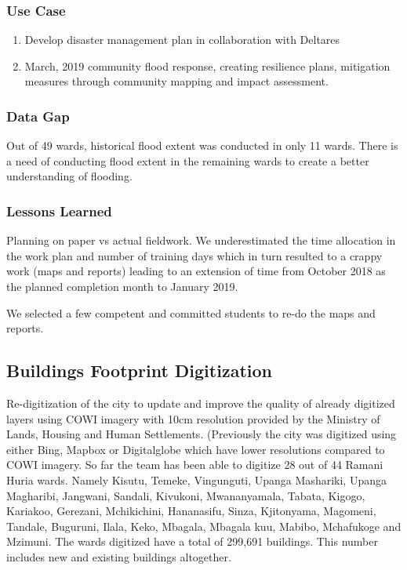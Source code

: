 \documentclass[a4paper,12pt,twoside]{article}
\begin{document}
\subsubsection{Use Case}
\begin{enumerate}
    \item Develop disaster management plan in collaboration with Deltares
    \item March, 2019 community flood response, creating resilience plans, mitigation measures through community mapping and impact assessment.
\end{enumerate}


\subsubsection{Data Gap}
Out of 49 wards, historical flood extent was conducted in only 11 wards. There is a need of conducting flood extent in the remaining wards to create a better understanding of flooding.

\subsubsection{Lessons Learned}
Planning on paper vs actual fieldwork. We underestimated the time allocation in the work plan and number of training days which in turn resulted to a crappy work (maps and reports) leading to an  extension of time from October 2018 as the planned completion month to January 2019.

\medskip
We selected a few competent and committed students to re-do the maps and reports.


\newpage
\subsection{Buildings Footprint Digitization}
\begin{multicols}{2}
Re-digitization of the city to update and improve the quality of already digitized layers using COWI imagery with 10cm resolution provided by the Ministry of Lands, Housing and Human Settlements. (Previously the city was digitized using either Bing, Mapbox or Digitalglobe which have lower resolutions compared to COWI imagery. So far the team has been able to digitize 28 out of 44 Ramani Huria wards. Namely Kisutu, Temeke, Vingunguti, Upanga Mashariki, Upanga Magharibi, Jangwani, Sandali, Kivukoni, Mwananyamala, Tabata, Kigogo, Kariakoo, Gerezani, Mchikichini, Hananasifu, Sinza, Kjitonyama, Magomeni, Tandale, Buguruni, Ilala, Keko, Mbagala, Mbagala kuu, Mabibo, Mchafukoge and Mzimuni. The wards digitized have a total of 299,691 buildings. This number includes new and existing buildings altogether.
\end{multicols}
\end{document}

